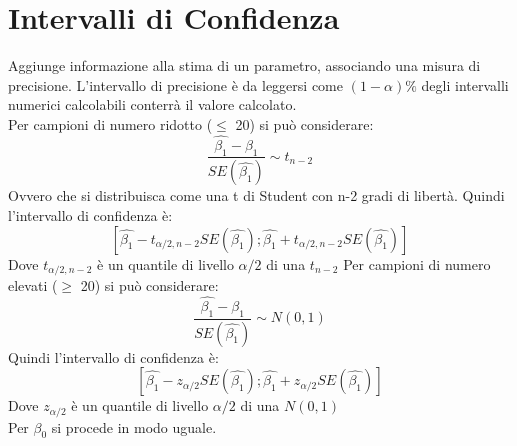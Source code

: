 \section{Intervalli di Confidenza}
Aggiunge informazione alla stima di un parametro, associando una misura di 
precisione. L'intervallo di precisione è da leggersi come $(1-\alpha) \% $ 
degli intervalli numerici calcolabili conterrà il valore calcolato.\\
Per campioni di numero ridotto ($\le$ 20) si può considerare:
\[ \frac{\hat{\beta_1} - \beta_1}{SE(\hat{\beta_1})} \sim t_{n-2} \]
Ovvero che si distribuisca come una t di Student con n-2 gradi di libertà.
Quindi l'intervallo di confidenza è:
\[ [ \hat{\beta_1} - t_{\alpha/2, n-2} SE(\hat{\beta_1}) ; \hat{\beta_1} + 
t_{\alpha/2, n-2} SE(\hat{\beta_1}) ] \]
Dove $t_{\alpha/2, n-2}$ è un quantile di livello $\alpha/2$ di una $t_{n-2}$
Per campioni di numero elevati ($\ge$ 20) si pu\`o considerare:
\[ \frac{\hat{\beta_1} - \beta_1}{SE(\hat{\beta_1})} \sim N(0,1) \]
Quindi l'intervallo di confidenza è:
\[ [ \hat{\beta_1} - z_{\alpha/2} SE(\hat{\beta_1}) ; \hat{\beta_1} +  
z_{\alpha/2} SE(\hat{\beta_1}) ] \]
Dove $z_{\alpha/2}$ è un quantile di livello $\alpha/2$ di una $N(0,1)$
\\ Per $\beta_0$ si procede in modo uguale.
